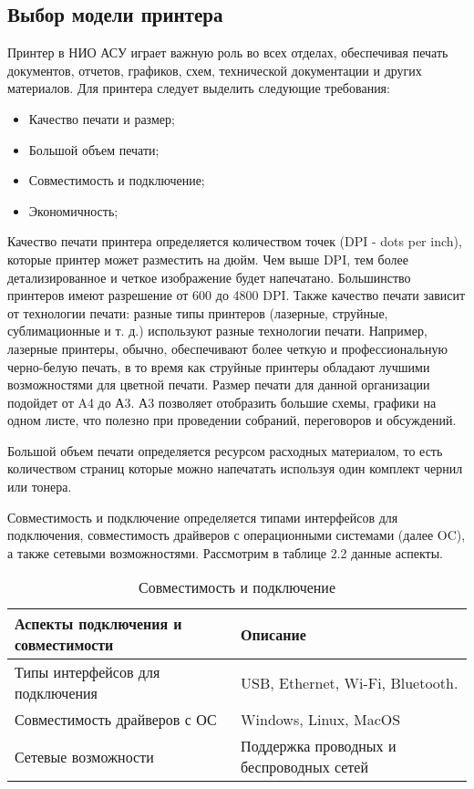 \subsection{Выбор модели принтера}

Принтер в НИО АСУ играет важную роль во всех отделах, 
обеспечивая печать документов, отчетов, графиков, схем, технической документации и других материалов.
Для принтера следует выделить следующие требования:

\begin{itemize}
    \item Качество печати и размер;
    \item Большой объем печати;
    \item Совместимость и подключение;
    \item Экономичность;
\end{itemize}

Качество печати принтера определяется количеством точек (DPI - dots per inch), которые принтер может разместить на дюйм. 
Чем выше DPI, тем более детализированное и четкое изображение будет напечатано. 
Большинство принтеров имеют разрешение от 600 до 4800 DPI. Также качество печати зависит от технологии печати: разные типы принтеров 
(лазерные, струйные, сублимационные и т. д.) используют разные технологии печати. Например, лазерные принтеры, обычно, обеспечивают 
более четкую и профессиональную черно-белую печать, в то время как струйные принтеры обладают лучшими возможностями для цветной печати.
Размер печати для данной организации подойдет от A4 до А3. А3 позволяет отобразить большие схемы, графики на одном листе, что полезно 
при проведении собраний, переговоров и обсуждений.

Большой объем печати определяется ресурсом расходных материалом, то есть количеством страниц которые можно напечатать используя один комплект 
чернил или тонера.

Совместимость и подключение определяется типами интерфейсов для подключения, совместимость драйверов с операционными 
системами (далее OC), а также сетевыми возможностями.
Рассмотрим в таблице 2.2 данные аспекты.

\begin{table}[ht]
    \caption{Совместимость и подключение}
    \label{table:func:printersConnectionProperty}
    \begin{tabular}{| >{\raggedright}m{}
                    | >{\raggedright\arraybackslash}m{}|}
        \hline
        \centering Аспекты подключения и совместимости & \centering\arraybackslash Описание \\

        \hline
        Типы интерфейсов для подключения &
        USB, Ethernet, Wi-Fi, Bluetooth.
        \\
        \hline
        Совместимость драйверов с ОС &
        Windows, Linux, MacOS
        \\
        \hline
        Сетевые возможности &
        Поддержка проводных и беспроводных сетей
        \\
        
        \hline
    \end{tabular}
\end{table}

